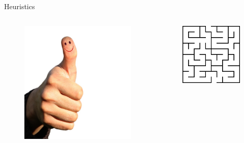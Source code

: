\documentclass[24pt]{beamer}
\begin{document}
    \begin{frame}{Heuristics}
        \begin{columns}
                \begin{figure}
                \includegraphics[scale=0.3]{thumb}
                \end{figure}
            \pause
                \begin{figure}
                \includegraphics[scale=0.4]{maze}
                \end{figure}
        \end{columns}
    \end{frame}
\end{document}
